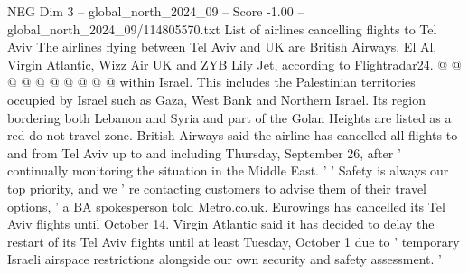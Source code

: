 \begin{textsample}{NEG Dim 3 – global\_north\_2024\_09 – Score -1.00 – global\_north\_2024\_09/114805570.txt}
List of airlines cancelling flights to Tel Aviv The airlines flying between Tel Aviv and UK are British Airways, El Al, Virgin Atlantic, Wizz Air UK and ZYB Lily Jet, according to Flightradar24. @ @ @ @ @ @ @ @ @ @ within Israel.
This includes the Palestinian territories occupied by Israel such as Gaza, West Bank and Northern Israel.
Its region bordering both Lebanon and Syria and part of the Golan Heights are listed as a red do-not-travel-zone.
British Airways said the airline has cancelled all flights to and from Tel Aviv up to and including Thursday, September 26, after ' continually monitoring the situation in the Middle East. ' ' Safety is always our top priority, and we ' re contacting customers to advise them of their travel options, ' a BA spokesperson told Metro.co.uk.
Eurowings has cancelled its Tel Aviv flights until October 14.
Virgin Atlantic said it has decided to delay the restart of its Tel Aviv flights until at least Tuesday, October 1 due to ' temporary Israeli airspace restrictions alongside our own security and safety assessment. '

\end{textsample}
